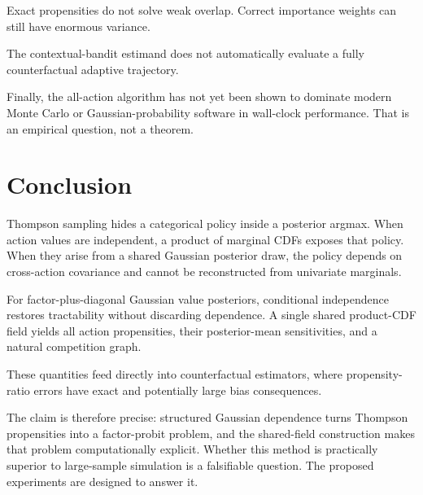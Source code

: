 \documentclass[11pt]{article}
\begin{document}
Exact propensities do not solve weak overlap. Correct importance weights can still have enormous variance.

The contextual-bandit estimand does not automatically evaluate a fully counterfactual adaptive trajectory.

Finally, the all-action algorithm has not yet been shown to dominate modern Monte Carlo or Gaussian-probability software in wall-clock performance. That is an empirical question, not a theorem.

\section{Conclusion}

Thompson sampling hides a categorical policy inside a posterior argmax. When action values are independent, a product of marginal CDFs exposes that policy. When they arise from a shared Gaussian posterior draw, the policy depends on cross-action covariance and cannot be reconstructed from univariate marginals.

For factor-plus-diagonal Gaussian value posteriors, conditional independence restores tractability without discarding dependence. A single shared product-CDF field yields all action propensities, their posterior-mean sensitivities, and a natural competition graph.

These quantities feed directly into counterfactual estimators, where propensity-ratio errors have exact and potentially large bias consequences.

The claim is therefore precise: structured Gaussian dependence turns Thompson propensities into a factor-probit problem, and the shared-field construction makes that problem computationally explicit. Whether this method is practically superior to large-sample simulation is a falsifiable question. The proposed experiments are designed to answer it.

\printbibliography
\end{document}
